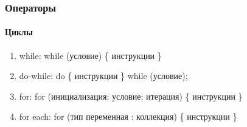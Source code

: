 \documentclass[10pt,pdf,hyperref={unicode}]{beamer}
\begin{document}
\begin{frame}[fragile]
\frametitle{Операторы}
\framesubtitle{Циклы}
\begin{enumerate}
  \item while:
    \newline while (условие) \{
    \newline     инструкции
    \newline \}
  \item do-while:
    \newline do \{
    \newline     инструкции
    \newline \} while (условие);
  \item for:
    \newline for (инициализация; условие; итерация) \{
    \newline     инструкции
    \newline \}
  \item for each:
    \newline for (тип переменная : коллекция) \{
    \newline     инструкции
    \newline \}
\end{enumerate}
\end{frame}
\end{document}
